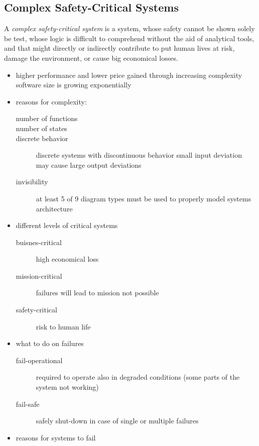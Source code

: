 \documentclass[a4paper, 10pt]{article}
\begin{document}
\subsection*{Complex Safety-Critical Systems}
\begin{shaded}
    A \emph{complex safety-critical system} is a system, whose safety cannot be shown solely be test, whose logic is difficult to comprehend without the aid of analytical tools, and that might directly or indirectly contribute to put human lives at risk, damage the environment, or cause big economical losses.
\end{shaded}
\begin{itemize}
    \item higher performance and lower price gained through increasing complexity \follows software size is growing exponentially
    \item reasons for complexity:
    \begin{description}
        \item[number of functions]
        \item[number of states]
        \item[discrete behavior] discrete systems with discontinuous behavior \follows small input deviation may cause large output deviations
        \item[invisibility] at least 5 of 9 diagram types must be used to properly model systems architecture
    \end{description}
    \item different levels of critical systems
    \begin{description}
        \item[buisnes-critical] high economical loss
        \item[mission-critical] failures will lead to mission not possible
        \item[safety-critical] risk to human life
    \end{description}
    \item what to do on failures
    \begin{description}
        \item[fail-operational] required to operate also in degraded conditions (some parts of the system not working)
        \item[fail-safe] safely shut-down in case of single or multiple failures
    \end{description}
    \item reasons for systems to fail
    \begin{description}

\end{description}
\end{itemize}
\end{document}
